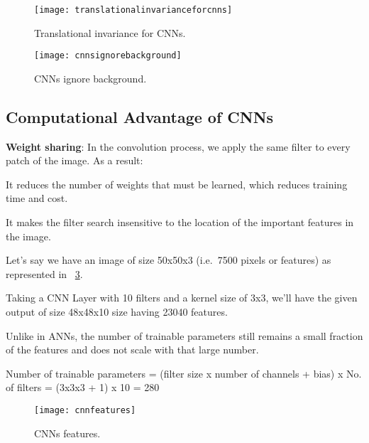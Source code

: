 	\begin{figure}[tbh]
		\centering
		\texttt{[image: translationalinvarianceforcnns]}
		\caption[Translational invariance for CNNs]{Translational invariance for CNNs.}
		\label{fig:translationalinvarianceforcnns}
	\end{figure}

	\begin{figure}[tbh]
		\centering
		\texttt{[image: cnnsignorebackground]}
		\caption[CNNs ignore background]{CNNs ignore background.}
		\label{fig:cnnsignorebackground}
	\end{figure}

	\subsection{Computational Advantage of CNNs}
	\begin{bulletedlist}
		\item \textbf{Weight sharing}: In the convolution process, we apply the same filter to every patch of the image.
As a result:
		\begin{bulletedlist}
			\item It reduces the number of weights that must be learned, which reduces training time and cost.
			\item It makes the filter search insensitive to the location of the important features in the image.
		\end{bulletedlist}
		\item Let's say we have an image of size 50x50x3 (i.e.\ 7500 pixels or features) as represented in \figurename~\ref{fig:cnnfeatures}.
		\begin{bulletedlist}
			\item Taking a CNN Layer with 10 filters and a kernel size of 3x3, we'll have the given output of size 48x48x10 size having 23040 features.
			\item Unlike in ANNs, the number of trainable parameters still remains a small fraction of the features and does not scale with that large number.
			\item Number of trainable parameters = (filter size x number of channels + bias) x No. of filters = (3x3x3 + 1) x 10 = 280
		\end{bulletedlist}
	\end{bulletedlist}

	\begin{figure}[tbh]
		\centering
		\texttt{[image: cnnfeatures]}
		\caption[CNNs features]{CNNs features.}
		\label{fig:cnnfeatures}
	\end{figure}

